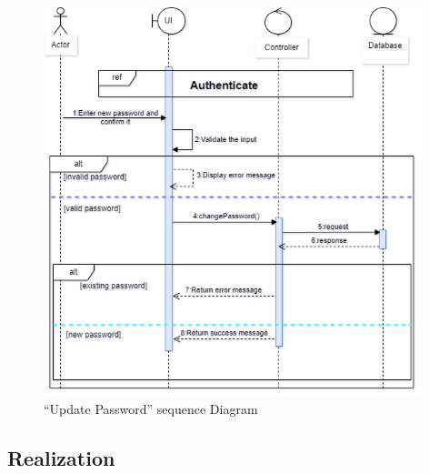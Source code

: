 \begin{figure}[H]
\includegraphics[width=0.98\textwidth]{images/chap2/changePassword_c.png}
    \caption{“Update Password” sequence Diagram}
    \label{fig:enter-label}    
\end{figure}
% 
% 
% 
\newpage
\subsection{Realization}
